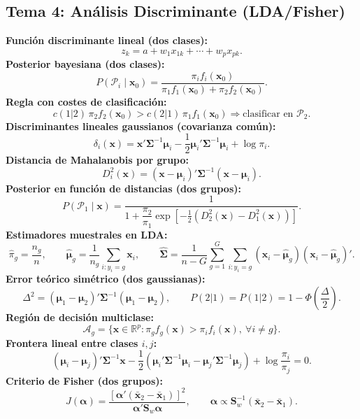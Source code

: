 \documentclass[12pt, a4paper]{article}
\theoremstyle{plain}
\theoremstyle{definition}
\theoremstyle{remark}
\newcommand{\R}{\mathbb{R}}
\newcommand{\mat}[1]{\mathbf{#1}}
\begin{document}
\subsection*{Tema 4: Análisis Discriminante (LDA/Fisher)}
\begin{mdframed}[style=resultado]
\textbf{Función discriminante lineal (dos clases):}
\[
  z_k=a+w_1x_{1k}+\cdots+w_px_{pk}.
\]
\textbf{Posterior bayesiana (dos clases):}
\[
  P(\mathcal{P}_i\mid\mathbf{x}_0)=
  \frac{\pi_i f_i(\mathbf{x}_0)}
       {\pi_1 f_1(\mathbf{x}_0)+\pi_2 f_2(\mathbf{x}_0)}.
\]
\textbf{Regla con costes de clasificación:}
\[
  c(1|2)\,\pi_2 f_2(\mathbf{x}_0) > c(2|1)\,\pi_1 f_1(\mathbf{x}_0)
  \Longrightarrow \text{clasificar en }\mathcal{P}_2.
\]
\textbf{Discriminantes lineales gaussianos (covarianza común):}
\[
  \delta_i(\mathbf{x})=
  \mathbf{x}'\boldsymbol{\Sigma}^{-1}\boldsymbol{\mu}_i
  -\frac12\boldsymbol{\mu}_i'\boldsymbol{\Sigma}^{-1}\boldsymbol{\mu}_i
  +\log\pi_i.
\]
\textbf{Distancia de Mahalanobis por grupo:}
\[
  D_i^2(\mathbf{x})=(\mathbf{x}-\boldsymbol{\mu}_i)'\boldsymbol{\Sigma}^{-1}(\mathbf{x}-\boldsymbol{\mu}_i).
\]
\textbf{Posterior en función de distancias (dos grupos):}
\[
  P(\mathcal{P}_1\mid\mathbf{x})=
  \frac{1}{1+\dfrac{\pi_2}{\pi_1}
  \exp\!\left[-\frac12\left(D_2^2(\mathbf{x})-D_1^2(\mathbf{x})\right)\right]}.
\]
\textbf{Estimadores muestrales en LDA:}
\[
  \hat{\pi}_g=\frac{n_g}{n},\qquad
  \hat{\boldsymbol{\mu}}_g=\frac{1}{n_g}\sum_{i:y_i=g}\mathbf{x}_i,\qquad
  \hat{\boldsymbol{\Sigma}}=\frac{1}{n-G}\sum_{g=1}^{G}\sum_{i:y_i=g}
  (\mathbf{x}_i-\hat{\boldsymbol{\mu}}_g)(\mathbf{x}_i-\hat{\boldsymbol{\mu}}_g)'.
\]
\textbf{Error teórico simétrico (dos gaussianas):}
\[
  \Delta^2=(\boldsymbol{\mu}_1-\boldsymbol{\mu}_2)'\boldsymbol{\Sigma}^{-1}(\boldsymbol{\mu}_1-\boldsymbol{\mu}_2),
  \qquad
  P(2|1)=P(1|2)=1-\Phi\!\left(\frac{\Delta}{2}\right).
\]
\textbf{Región de decisión multiclase:}
\[
  \mathcal{A}_g=\{\mathbf{x}\in\R^p:\pi_g f_g(\mathbf{x})>\pi_i f_i(\mathbf{x}),\ \forall i\neq g\}.
\]
\textbf{Frontera lineal entre clases $i,j$:}
\[
  (\boldsymbol{\mu}_i-\boldsymbol{\mu}_j)'\boldsymbol{\Sigma}^{-1}\mathbf{x}
  -\frac12\!\left(\boldsymbol{\mu}_i'\boldsymbol{\Sigma}^{-1}\boldsymbol{\mu}_i-\boldsymbol{\mu}_j'\boldsymbol{\Sigma}^{-1}\boldsymbol{\mu}_j\right)
  +\log\frac{\pi_i}{\pi_j}=0.
\]
\textbf{Criterio de Fisher (dos grupos):}
\[
  J(\boldsymbol{\alpha})=
  \frac{\left[\boldsymbol{\alpha}'(\bar{\mathbf{x}}_2-\bar{\mathbf{x}}_1)\right]^2}
       {\boldsymbol{\alpha}'\mat{S}_w\boldsymbol{\alpha}},
  \qquad
  \boldsymbol{\alpha}\propto\mat{S}_w^{-1}(\bar{\mathbf{x}}_2-\bar{\mathbf{x}}_1).
\]
\end{mdframed}
\end{document}
